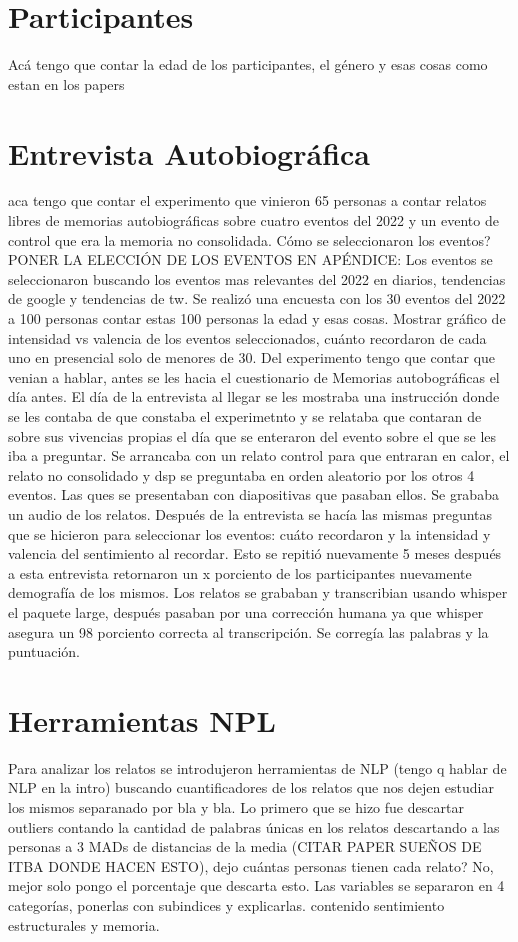 \section{Participantes}\label{paracitar}
Acá tengo que contar la edad de los participantes, el género y esas cosas como estan en los papers
\section{Entrevista Autobiográfica}
aca tengo que contar el experimento que vinieron 65 personas a contar relatos libres de memorias autobiográficas sobre cuatro eventos del 2022 y un evento de control que era la memoria no consolidada. Cómo se seleccionaron los eventos? PONER LA ELECCIÓN DE LOS EVENTOS EN APÉNDICE: Los eventos se seleccionaron buscando los eventos mas relevantes del 2022 en diarios, tendencias de google y tendencias de tw. Se realizó una encuesta con los 30 eventos del 2022 a 100 personas contar estas 100 personas la edad y esas cosas. Mostrar gráfico de intensidad vs valencia de los eventos seleccionados, cuánto recordaron de cada uno en presencial solo de menores de 30. 
Del experimento tengo que contar que venian a hablar, antes se les hacia el cuestionario de Memorias autobográficas el día antes. El día de la entrevista al llegar se les mostraba una instrucción donde se les contaba de que constaba el experimetnto y se relataba que contaran de sobre sus vivencias propias el día que se enteraron del evento sobre el que se les iba a preguntar. Se arrancaba con un relato control para que entraran en calor, el relato no consolidado y dsp se preguntaba en orden aleatorio por los otros 4 eventos. Las ques se presentaban con diapositivas que pasaban ellos. Se grababa un audio de los relatos. Después de la entrevista se hacía las mismas preguntas que se hicieron para seleccionar los eventos: cuáto recordaron y la intensidad y valencia del sentimiento al recordar. Esto se repitió nuevamente 5 meses después a esta entrevista retornaron un x porciento de los participantes nuevamente demografía de los mismos.
Los relatos se grababan y transcribian usando whisper el paquete large, después pasaban por una corrección humana ya que whisper asegura un 98 porciento correcta al transcripción. Se corregía las palabras y la puntuación.
\section{Herramientas NPL}

Para analizar los relatos se introdujeron herramientas de NLP (tengo q hablar de NLP en la intro) buscando cuantificadores de los relatos que nos dejen estudiar los mismos separanado por bla y bla. Lo primero que se hizo fue descartar outliers contando la cantidad de palabras únicas en los relatos descartando a las personas a 3 MADs de distancias de la media (CITAR PAPER SUEÑOS DE ITBA DONDE HACEN ESTO), dejo cuántas personas tienen cada relato? No, mejor solo pongo el porcentaje que descarta esto. Las variables se separaron en 4 categorías, ponerlas con subindices y explicarlas. contenido sentimiento estructurales y memoria.
